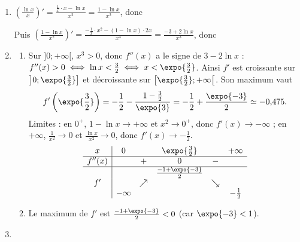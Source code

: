 \begin{enumerate}
   \item {}
      $\left(\frac{\ln x}{x}\right)' = \frac{\frac{1}{x}\cdot x - \ln x}{x^2} = \frac{1 - \ln x}{x^2}$, donc
      \par\noindent{}

      Puis $\left(\frac{1 - \ln x}{x^2}\right)' = \frac{-\frac{1}{x}\cdot x^2 - (1 - \ln x)\cdot 2x}{x^4} = \frac{-3 + 2\ln x}{x^3}$, donc
      \par\noindent{}
   \item
      \begin{enumerate}
         \item {}
            Sur $]0 ; +\infty[$, $x^3 > 0$, donc $f''(x)$ a le signe de $3 - 2\ln x$ :
            $f''(x) > 0 \iff \ln x < \frac{3}{2} \iff x < \expo{\frac{3}{2}}$.
            Ainsi $f'$ est croissante sur $\left]0 ; \expo{\frac{3}{2}}\right]$ et d\'ecroissante sur $\left[\expo{\frac{3}{2}} ; +\infty\right[$.
            Son maximum vaut
            \[
               f'\left(\expo{\frac{3}{2}}\right) = -\frac{1}{2} - \frac{1 - \frac{3}{2}}{\expo{3}} = -\frac{1}{2} + \frac{\expo{-3}}{2} \simeq -0{,}475.
            \]
            Limites : en $0^+$, $1 - \ln x \to +\infty$ et $x^2 \to 0^+$, donc $f'(x) \to -\infty$ ; en $+\infty$,
            $\frac{1}{x^2} \to 0$ et $\frac{\ln x}{x^2} \to 0$, donc $f'(x) \to -\frac{1}{2}$.
            \[
               \begin{array}{c|ccccc}
                  x & 0 & & \expo{\frac{3}{2}} & & +\infty \\ \hline
                  f''(x) & & + & 0 & - & \\ \hline
                  & & & \frac{-1 + \expo{-3}}{2} & & \\
                  f' & & \nearrow & & \searrow & \\
                  & -\infty & & & & -\frac{1}{2}
               \end{array}
            \]
         \item {}
            Le maximum de $f'$ est $\frac{-1 + \expo{-3}}{2} < 0$ (car $\expo{-3} < 1$).
            \par\noindent{}
      \end{enumerate}
   \item {}

\end{enumerate}
